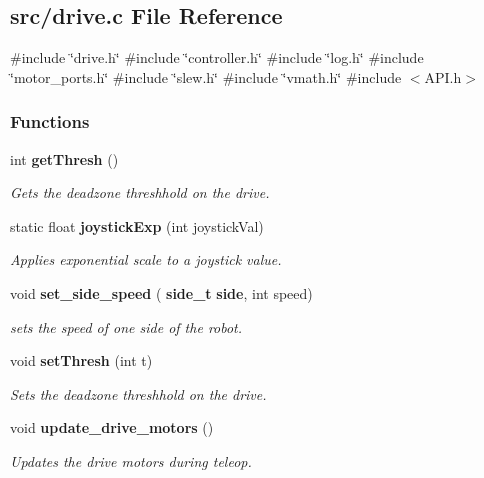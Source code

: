 \subsection{src/drive.c File Reference}
\label{a00092}
{\ttfamily \#include \char`\"{}drive.\+h\char`\"{}}\newline
{\ttfamily \#include \char`\"{}controller.\+h\char`\"{}}\newline
{\ttfamily \#include \char`\"{}log.\+h\char`\"{}}\newline
{\ttfamily \#include \char`\"{}motor\+\_\+ports.\+h\char`\"{}}\newline
{\ttfamily \#include \char`\"{}slew.\+h\char`\"{}}\newline
{\ttfamily \#include \char`\"{}vmath.\+h\char`\"{}}\newline
{\ttfamily \#include $<$A\+P\+I.\+h$>$}\newline
\subsubsection*{Functions}
\begin{DoxyCompactItemize}
\item 
int \textbf{ get\+Thresh} ()
\begin{DoxyCompactList}\small\item\em Gets the deadzone threshhold on the drive. \end{DoxyCompactList}\item 
static float \textbf{ joystick\+Exp} (int joystick\+Val)
\begin{DoxyCompactList}\small\item\em Applies exponential scale to a joystick value. \end{DoxyCompactList}\item 
void \textbf{ set\+\_\+side\+\_\+speed} (\textbf{ side\+\_\+t} \textbf{ side}, int speed)
\begin{DoxyCompactList}\small\item\em sets the speed of one side of the robot. \end{DoxyCompactList}\item 
void \textbf{ set\+Thresh} (int t)
\begin{DoxyCompactList}\small\item\em Sets the deadzone threshhold on the drive. \end{DoxyCompactList}\item 
void \textbf{ update\+\_\+drive\+\_\+motors} ()
\begin{DoxyCompactList}\small\item\em Updates the drive motors during teleop. \end{DoxyCompactList}\end{DoxyCompactItemize}
